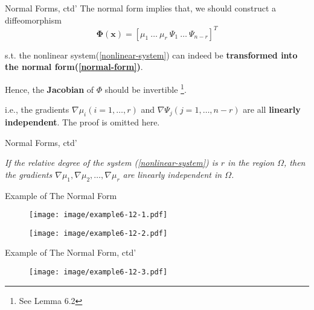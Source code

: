 \documentclass{beamer}
\renewcommand{\vec}[1]{\ensuremath{\boldsymbol{#1}}} %
\begin{document}
\begin{frame}{Normal Forms, ctd'}
    The normal form implies that, we should construct a {\color{red}diffeomorphism}
    \begin{equation}\label{diffeomorphism}
      \vec{\Phi}(\vec{x}) = \left[ \mu_{1}~\dots~\mu_{r}~\Psi_{1}~\dots~\Psi_{n-r} \right]^{T}
    \end{equation}

    s.t. the nonlinear system(\ref{nonlinear-system}) can indeed be \textbf{transformed into the normal form(\ref{normal-form})}.

    Hence, the \textbf{Jacobian} of $\Phi$ should be invertible \footnote{See Lemma 6.2}.

    i.e., the gradients $\nabla \mu_{i}(i=1, \dots, r)$ and $\nabla \Psi_{j}(j=1, \dots, n-r)$ are all \textbf{linearly independent}. The proof is omitted here.
\end{frame}

\begin{frame}{Normal Forms, ctd'}
    \begin{lemma}[6.5]
    \textit{
    If the relative degree of the system (\ref{nonlinear-system}) is $r$ in the region $\Omega$, then the gradients $\nabla \mu_{1}, \nabla \mu_{2}, \dots, \nabla \mu_{r}$ are linearly independent in $\Omega$.
    }
    \end{lemma}
\end{frame}

\begin{frame}{Example of The Normal Form}
    \begin{figure}
      \centering
      \texttt{[image: image/example6-12-1.pdf]}
    \end{figure}
    \vspace{-20pt}
    \begin{figure}
      \centering
      \texttt{[image: image/example6-12-2.pdf]}
    \end{figure}
\end{frame}

\begin{frame}{Example of The Normal Form, ctd'}
    \begin{figure}
      \centering
      \texttt{[image: image/example6-12-3.pdf]}
    \end{figure}
\end{frame}
\end{document}
